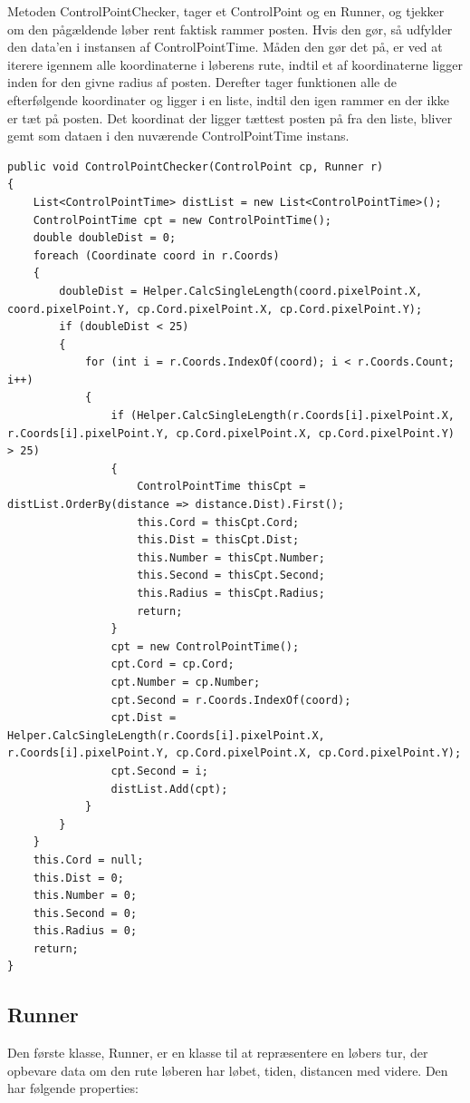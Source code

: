Metoden ControlPointChecker, tager et ControlPoint og en Runner, og tjekker om den pågældende løber rent faktisk rammer posten. Hvis den gør, så udfylder den data’en i instansen af ControlPointTime. 
Måden den gør det på, er ved at iterere igennem alle koordinaterne i løberens rute, indtil et af koordinaterne ligger inden for den givne radius af posten. Derefter tager funktionen alle de efterfølgende koordinater og ligger i en liste, indtil den igen rammer en der ikke er tæt på posten. 
Det koordinat der ligger tættest posten på fra den liste, bliver gemt som dataen i den nuværende ControlPointTime instans. 


\begin{lstlisting}
public void ControlPointChecker(ControlPoint cp, Runner r)
{
    List<ControlPointTime> distList = new List<ControlPointTime>();
    ControlPointTime cpt = new ControlPointTime();
    double doubleDist = 0;
    foreach (Coordinate coord in r.Coords)
    {
        doubleDist = Helper.CalcSingleLength(coord.pixelPoint.X, coord.pixelPoint.Y, cp.Cord.pixelPoint.X, cp.Cord.pixelPoint.Y);
        if (doubleDist < 25)
        {
            for (int i = r.Coords.IndexOf(coord); i < r.Coords.Count; i++)
            {
                if (Helper.CalcSingleLength(r.Coords[i].pixelPoint.X, r.Coords[i].pixelPoint.Y, cp.Cord.pixelPoint.X, cp.Cord.pixelPoint.Y) > 25)
                {
                    ControlPointTime thisCpt = distList.OrderBy(distance => distance.Dist).First();
                    this.Cord = thisCpt.Cord;
                    this.Dist = thisCpt.Dist;
                    this.Number = thisCpt.Number;
                    this.Second = thisCpt.Second;
                    this.Radius = thisCpt.Radius;
                    return;
                }
                cpt = new ControlPointTime();
                cpt.Cord = cp.Cord;
                cpt.Number = cp.Number;
                cpt.Second = r.Coords.IndexOf(coord);
                cpt.Dist = Helper.CalcSingleLength(r.Coords[i].pixelPoint.X, r.Coords[i].pixelPoint.Y, cp.Cord.pixelPoint.X, cp.Cord.pixelPoint.Y);
                cpt.Second = i;
                distList.Add(cpt);
            }    
        }
    }
    this.Cord = null;
    this.Dist = 0;
    this.Number = 0;
    this.Second = 0;
    this.Radius = 0;
    return;
}
\end{lstlisting}

\subsection{Runner}
Den første klasse, Runner, er en klasse til at repræsentere en løbers tur, der opbevare data om den rute løberen har løbet, tiden, distancen med videre. Den har følgende properties:

